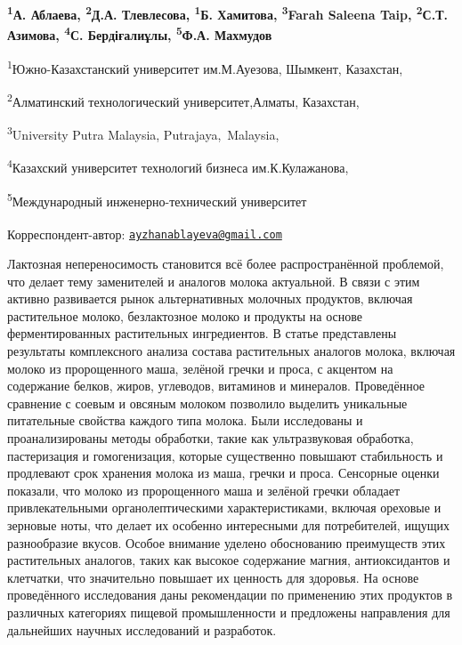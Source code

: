 
\begin{articleheader}

{\bfseries
\textsuperscript{1}А. Аблаева\textsuperscript{\envelope },
\textsuperscript{2}Д.А. Тлевлесова,
\textsuperscript{1}Б. Хамитова,
\textsuperscript{3}Farah Saleena Taip,
\textsuperscript{2}С.Т. Азимова,
\textsuperscript{4}С. Бердіғалиұлы,
\textsuperscript{5}Ф.А. Махмудов
}
\end{articleheader}

\begin{affiliation}
\textsuperscript{1}Южно-Казахстанский университет им.М.Ауезова, Шымкент, Казахстан,

\textsuperscript{2}Алматинский технологический университет,Алматы, Казахстан,

\textsuperscript{3}University Putra Malaysia, Putrajaya,~Malaysia,

\textsuperscript{4}Казахский университет технологий бизнеса им.К.Кулажанова,

\textsuperscript{5}Международный инженерно-технический университет

\raggedright \textsuperscript{\envelope }Корреспондент-автор:
\href{mailto:ayzhanablayeva@gmail.com}{\nolinkurl{ayzhanablayeva@gmail.com}}
\end{affiliation}

Лактозная непереносимость становится всё более распространённой
проблемой, что делает тему заменителей и аналогов молока актуальной. В
связи с этим активно развивается рынок альтернативных молочных
продуктов, включая растительное молоко, безлактозное молоко и продукты
на основе ферментированных растительных ингредиентов. В статье
представлены результаты комплексного анализа состава растительных
аналогов молока, включая молоко из пророщенного маша, зелёной гречки и
проса, с акцентом на содержание белков, жиров, углеводов, витаминов и
минералов. Проведённое сравнение с соевым и овсяным молоком позволило
выделить уникальные питательные свойства каждого типа молока. Были
исследованы и проанализированы методы обработки, такие как
ультразвуковая обработка, пастеризация и гомогенизация, которые
существенно повышают стабильность и продлевают срок хранения молока из
маша, гречки и проса. Сенсорные оценки показали, что молоко из
пророщенного маша и зелёной гречки обладает привлекательными
органолептическими характеристиками, включая ореховые и зерновые ноты,
что делает их особенно интересными для потребителей, ищущих разнообразие
вкусов. Особое внимание уделено обоснованию преимуществ этих
растительных аналогов, таких как высокое содержание магния,
антиоксидантов и клетчатки, что значительно повышает их ценность для
здоровья. На основе проведённого исследования даны рекомендации по
применению этих продуктов в различных категориях пищевой промышленности
и предложены направления для дальнейших научных исследований и
разработок.

